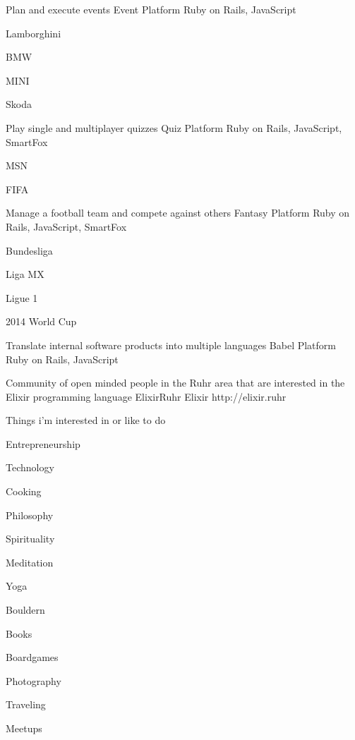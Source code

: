 \documentclass[]{awesome-cv}
\begin{document}
\begin{cventries}
	\cventry
	{Plan and execute events}
	{Event Platform}
	{Ruby on Rails, JavaScript}
	{}
	{\begin{cvitems}
		\item {Lamborghini}
		\item {BMW}
		\item {MINI}
		\item {Skoda}
	\end{cvitems}}
	
	\vspace{-2mm}
	\cventry
	{Play single and multiplayer quizzes}
	{Quiz Platform}
	{Ruby on Rails, JavaScript, SmartFox}
	{}
	{\begin{cvitems}
		\item {MSN}
		\item {FIFA}
	\end{cvitems}}
	
	\vspace{-2mm}
	\cventry
	{Manage a football team and compete against others}
	{Fantasy Platform}
	{Ruby on Rails, JavaScript, SmartFox}
	{}
	{\begin{cvitems}
		\item {Bundesliga}
		\item {Liga MX}
		\item {Ligue 1}
		\item {2014 World Cup}
	\end{cvitems}}
	
	\vspace{-2mm}
	\cventry
	{Translate internal software products into multiple languages}
	{Babel Platform}
	{Ruby on Rails, JavaScript}
	{}
	{}
	
	\vspace{-2mm}
	\cventry
	{Community of open minded people in the Ruhr area that are interested in the Elixir programming language}
	{ElixirRuhr}
	{Elixir}
	{http://elixir.ruhr}
	{}
\end{cventries}

\vspace{-2mm}
\begin{cventries}
	\cventry
	{Things i'm interested in or like to do}
	{}
	{}
	{}
	{\begin{cvitems}
		\item {Entrepreneurship}
		\item {Technology}
		\item {Cooking}
		\item {Philosophy}
		\item {Spirituality}
		\item {Meditation}
		\item {Yoga}
		\item {Bouldern}
		\item {Books}
		\item {Boardgames}
		\item {Photography}
		\item {Traveling}
		\item {Meetups}
		\end{cvitems}}
\end{cventries}
    
\end{document}
